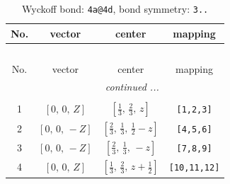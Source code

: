\documentclass[fleqn,8pt]{jsarticle}
\begin{document}
\renewcommand{\arraystretch}{1.2}
\begin{longtable}{cccc}
\caption{Wyckoff bond: {\tt 4a@4d}, bond symmetry: {\tt 3..}}
 \\
 \hline \hline
No. & vector & center & mapping \\ \hline \endfirsthead

\multicolumn{3}{l}{\tablename\ \thetable{}} \\
 \hline \hline
No. & vector & center & mapping \\ \hline \endhead

 \hline \hline
\multicolumn{3}{r}{\footnotesize\it continued ...} \\ \endfoot

 \hline \hline
\multicolumn{3}{r}{} \\ \endlastfoot

1 & $\left[ 0,\, 0,\, Z \right]$ & $\left[ \frac{1}{3},\, \frac{2}{3},\, z \right]$ & {\tt [1,2,3]} \\ \hline
2 & $\left[ 0,\, 0,\, - Z \right]$ & $\left[ \frac{2}{3},\, \frac{1}{3},\, \frac{1}{2} - z \right]$ & {\tt [4,5,6]} \\ \hline
3 & $\left[ 0,\, 0,\, - Z \right]$ & $\left[ \frac{2}{3},\, \frac{1}{3},\, - z \right]$ & {\tt [7,8,9]} \\ \hline
4 & $\left[ 0,\, 0,\, Z \right]$ & $\left[ \frac{1}{3},\, \frac{2}{3},\, z + \frac{1}{2} \right]$ & {\tt [10,11,12]} \\
\end{longtable}
\renewcommand{\arraystretch}{1.2}
\end{document}
